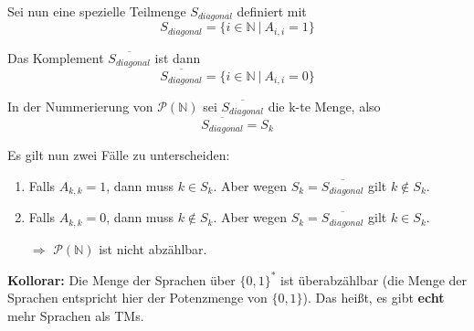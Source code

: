 \documentclass{scrartcl}%
\begin{document}
    \newpage
    Sei nun eine spezielle Teilmenge $S_{diagonal}$ definiert mit
    \begin{equation*}
        S_{diagonal} = \{i \in \mathbb{N} \ | \ A_{i,i} = 1 \}
    \end{equation*}

    Das Komplement $\overline{S_{diagonal}}$ ist dann
    \begin{equation*}
        \overline{S_{diagonal}} = \{i \in \mathbb{N} \ | \ A_{i,i} = 0 \}
    \end{equation*}

    \vspace*{0.5cm}
    In der Nummerierung von $\mathcal{P}(\mathbb{N})$ sei $\overline{S_{diagonal}}$ die k-te Menge, also
    \begin{equation*}
        \overline{S_{diagonal}} = S_k
    \end{equation*}

    Es gilt nun zwei Fälle zu unterscheiden:
    \begin{enumerate}
        \item Falls $A_{k,k} = 1$, dann muss $k \in S_k$. Aber wegen $S_k = \overline{S_{diagonal}}$ gilt $k \notin S_k$.
        \item Falls $A_{k,k} = 0$, dann muss $k \notin S_k$. Aber wegen $S_k = \overline{S_{diagonal}}$ gilt $k \in S_k$.
        \item [$\Rightarrow$] $\mathcal{P}(\mathbb{N})$ ist nicht abzählbar.    \proofend
    \end{enumerate}



    \textbf{\textsf{Kollorar:}} Die Menge der Sprachen über $\{0,1\}^*$ ist überabzählbar
    (die Menge der Sprachen entspricht hier der Potenzmenge von $\{0,1\}$). Das heißt, es gibt \textsf{\textbf{echt}} mehr Sprachen als TMs.
\end{document}
